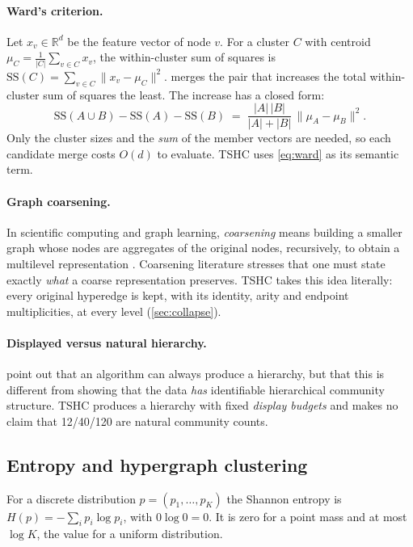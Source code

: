 \documentclass[11pt,a4paper]{article}
\newcommand{\cref}[1]{\autoref{#1}}
\theoremstyle{remark}
\newcommand{\R}{\mathbb{R}}
\begin{document}
\paragraph{Ward's criterion.}
Let $x_v\in\R^d$ be the feature vector of node $v$. For a cluster $C$ with centroid
$\mu_C=\frac1{|C|}\sum_{v\in C}x_v$, the within-cluster sum of squares is
$\mathrm{SS}(C)=\sum_{v\in C}\|x_v-\mu_C\|^2$. \citet{ward1963} merges the pair that
increases the total within-cluster sum of squares the least. The increase has a
closed form:
\begin{equation}
  \mathrm{SS}(A\cup B)-\mathrm{SS}(A)-\mathrm{SS}(B)
  \;=\;\frac{|A|\,|B|}{|A|+|B|}\,\|\mu_A-\mu_B\|^2 .
  \label{eq:ward}
\end{equation}
Only the cluster sizes and the \emph{sum} of the member vectors are needed, so each
candidate merge costs $O(d)$ to evaluate. TSHC uses \cref{eq:ward} as its semantic
term.

\paragraph{Graph coarsening.}
In scientific computing and graph learning, \emph{coarsening} means building a
smaller graph whose nodes are aggregates of the original nodes, recursively, to obtain
a multilevel representation \citep{chen2022coarsening}. Coarsening literature
stresses that one must state exactly \emph{what} a coarse representation preserves.
TSHC takes this idea literally: every original hyperedge is kept, with its identity,
arity and endpoint multiplicities, at every level (\cref{sec:collapse}).

\paragraph{Displayed versus natural hierarchy.}
\citet{schaub2023hierarchical} point out that an algorithm can always produce a
hierarchy, but that this is different from showing that the data \emph{has}
identifiable hierarchical community structure. TSHC produces a hierarchy with fixed
\emph{display budgets} and makes no claim that 12/40/120 are natural community
counts.

\subsection{Entropy and hypergraph clustering}

For a discrete distribution $p=(p_1,\dots,p_K)$ the Shannon entropy is
$H(p)=-\sum_i p_i\log p_i$, with $0\log 0=0$. It is zero for a point mass and at most
$\log K$, the value for a uniform distribution.
\end{document}
